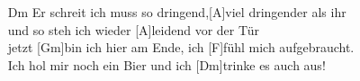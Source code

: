 \begin{guitarMagic}
\begin{enumerate}
        \item [Dm]Er schreit ich muss so dringend,[A]viel dringender als ihr\\
            [F]und so steh ich wieder [A]leidend vor der Tür\\
            jetzt [Gm]bin ich hier am Ende, ich [F]fühl mich aufgebraucht.\\
            [A]Ich hol mir noch ein Bier und ich [Dm]trinke es auch aus!\\
    \end{enumerate}
\end{guitarMagic}
